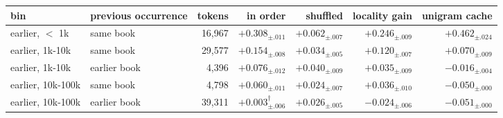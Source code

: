 \begin{tabular}{llrrrrr}
\toprule
bin & previous occurrence & tokens & in order & shuffled & locality gain & unigram cache \\
\midrule
earlier, $<$ 1k & same book & 16,967 & $+0.308_{\pm .011}$ & $+0.062_{\pm .007}$ & $+0.246_{\pm .009}$ & $+0.462_{\pm .024}$ \\
earlier, 1k-10k & same book & 29,577 & $+0.154_{\pm .008}$ & $+0.034_{\pm .005}$ & $+0.120_{\pm .007}$ & $+0.070_{\pm .009}$ \\
earlier, 1k-10k & earlier book & 4,396 & $+0.076_{\pm .012}$ & $+0.040_{\pm .009}$ & $+0.035_{\pm .009}$ & $-0.016_{\pm .004}$ \\
earlier, 10k-100k & same book & 4,798 & $+0.060_{\pm .011}$ & $+0.024_{\pm .007}$ & $+0.036_{\pm .010}$ & $-0.050_{\pm .000}$ \\
earlier, 10k-100k & earlier book & 39,311 & $+0.003_{\pm .006}^{\dagger}$ & $+0.026_{\pm .005}$ & $-0.024_{\pm .006}$ & $-0.051_{\pm .000}$ \\
\bottomrule
\end{tabular}
